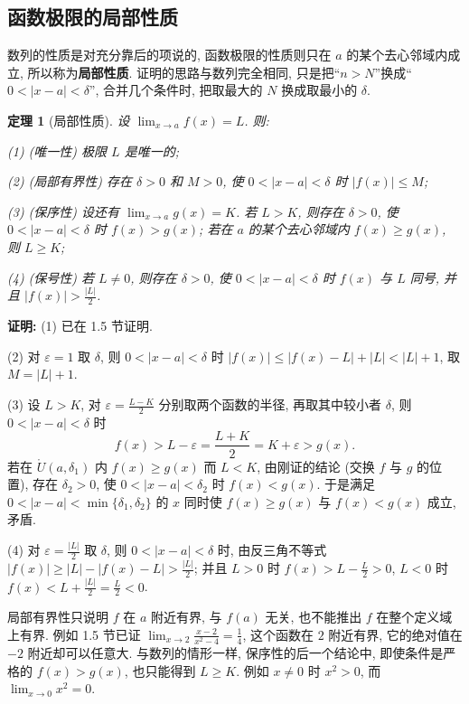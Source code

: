 \documentclass[UTF8,openany]{ctexbook}
\theoremstyle{chinesetextbook}
\newtheorem{theorem}{定理}[section]
\newenvironment{cnproof}{\par\indent\textbf{证明:} \ignorespaces}{\par}
\begin{document}
\subsection{函数极限的局部性质}
数列的性质是对充分靠后的项说的, 函数极限的性质则只在 $a$ 的某个去心邻域内成立, 所以称为\textbf{局部性质}. 证明的思路与数列完全相同, 只是把“$n>N$”换成“$0<|x-a|<\delta$”, 合并几个条件时, 把取最大的 $N$ 换成取最小的 $\delta$.
\begin{theorem}[局部性质]
设 $\displaystyle\lim_{x\to a}f(x)=L$. 则:

\textup{(1)} (唯一性) 极限 $L$ 是唯一的;

\textup{(2)} (局部有界性) 存在 $\delta>0$ 和 $M>0$, 使 $0<|x-a|<\delta$ 时 $|f(x)|\le M$;

\textup{(3)} (保序性) 设还有 $\displaystyle\lim_{x\to a}g(x)=K$. 若 $L>K$, 则存在 $\delta>0$, 使 $0<|x-a|<\delta$ 时 $f(x)>g(x)$; 若在 $a$ 的某个去心邻域内 $f(x)\ge g(x)$, 则 $L\ge K$;

\textup{(4)} (保号性) 若 $L\ne0$, 则存在 $\delta>0$, 使 $0<|x-a|<\delta$ 时 $f(x)$ 与 $L$ 同号, 并且 $\displaystyle|f(x)|>\frac{|L|}2$.
\end{theorem}
\begin{cnproof}
(1) 已在 1.5 节证明.

(2) 对 $\varepsilon=1$ 取 $\delta$, 则 $0<|x-a|<\delta$ 时 $|f(x)|\le|f(x)-L|+|L|<|L|+1$, 取 $M=|L|+1$.

(3) 设 $L>K$, 对 $\displaystyle\varepsilon=\frac{L-K}2$ 分别取两个函数的半径, 再取其中较小者 $\delta$, 则 $0<|x-a|<\delta$ 时
\[
f(x)>L-\varepsilon=\frac{L+K}2=K+\varepsilon>g(x).
\]
若在 $\mathring U(a,\delta_1)$ 内 $f(x)\ge g(x)$ 而 $L<K$, 由刚证的结论 (交换 $f$ 与 $g$ 的位置), 存在 $\delta_2>0$, 使 $0<|x-a|<\delta_2$ 时 $f(x)<g(x)$. 于是满足 $0<|x-a|<\min\{\delta_1,\delta_2\}$ 的 $x$ 同时使 $f(x)\ge g(x)$ 与 $f(x)<g(x)$ 成立, 矛盾.

(4) 对 $\displaystyle\varepsilon=\frac{|L|}2$ 取 $\delta$, 则 $0<|x-a|<\delta$ 时, 由反三角不等式 $\displaystyle|f(x)|\ge|L|-|f(x)-L|>\frac{|L|}2$; 并且 $L>0$ 时 $\displaystyle f(x)>L-\frac L2>0$, $L<0$ 时 $\displaystyle f(x)<L+\frac{|L|}2=\frac L2<0$.
\end{cnproof}
局部有界性只说明 $f$ 在 $a$ 附近有界, 与 $f(a)$ 无关, 也不能推出 $f$ 在整个定义域上有界. 例如 1.5 节已证 $\displaystyle\lim_{x\to2}\frac{x-2}{x^2-4}=\frac14$, 这个函数在 $2$ 附近有界, 它的绝对值在 $-2$ 附近却可以任意大. 与数列的情形一样, 保序性的后一个结论中, 即使条件是严格的 $f(x)>g(x)$, 也只能得到 $L\ge K$. 例如 $x\ne0$ 时 $x^2>0$, 而 $\displaystyle\lim_{x\to0}x^2=0$.
\end{document}
